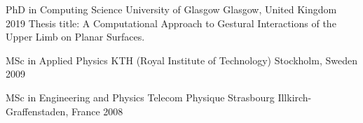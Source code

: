 

\begin{cventries}


  \cventry
    {PhD in Computing Science} %
    {University of Glasgow} %
    {Glasgow, United Kingdom} %
    {2019} %
    {Thesis title: A Computational Approach to Gestural Interactions of the Upper Limb on Planar Surfaces.}

  \cventry
    {MSc in Applied Physics} %
    {KTH (Royal Institute of Technology)} %
    {Stockholm, Sweden} %
    {2009} %
    {}

  \cventry
    {MSc in Engineering and Physics} %
    {Telecom Physique Strasbourg} %
    {Illkirch-Graffenstaden, France} %
    {2008} %
    {}

\end{cventries}

